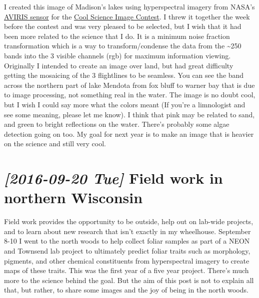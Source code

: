 \documentclass{article}
\begin{document}
I created this image of Madison's lakes using hyperspectral imagery
from NASA's \href{http://aviris.jpl.nasa.gov/}{AVIRIS sensor} for the \href{http://news.wisc.edu/cool-science-images-2016/}{Cool Science Image Contest}.  I threw
it together the week before the contest and was very pleased to be
selected, but I wish that it had been more related to the science that
I do.  It is a minimum noise fraction transformation which is a way to
transform/condense the data from the \textasciitilde{}250 bands into the 3 visible
channels (rgb) for maximum information viewing. Originally I intended
to create an image over land, but had great difficulty getting the
mosaicing of the 3 flightlines to be seamless.  You can see the band
across the northern part of lake Mendota from fox bluff to warner bay
that is due to image processing, not something real in the water.  The
image is no doubt cool, but I wish I could say more what the colors
meant (If you're a limnologist and see some meaning, please let me
know).  I think that pink may be related to sand, and green to bright
reflections on the water.  There's probably some algae detection going
on too.  My goal for next year is to make an image that is heavier on
the science and still very cool.

\section*{\textit{[2016-09-20 Tue] } Field work in northern Wisconsin}
\label{sec:org6d6a0f1}

Field work provides the opportunity to be outside, help out on
lab-wide projects, and to learn about new research that isn't exactly
in my wheelhouse.  September 8-10 I went to the north woods to help
collect foliar samples as part of a NEON and Townsend lab project to
ultimately predict foliar traits such as morphology, pigments, and
other chemical constituents from hyperspectral imagery to create maps
of these traits.  This was the first year of a five year project.
There's much more to the science behind the goal.  But the aim of this
post is not to explain all that, but rather, to share some images and
the joy of being in the north woods.
\end{document}
